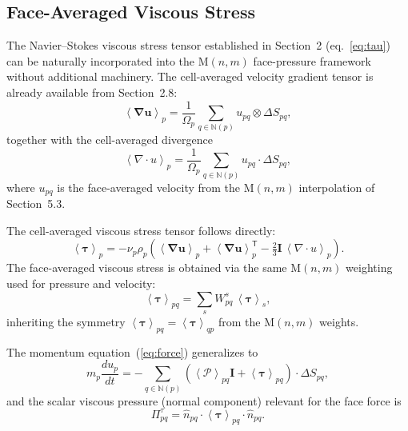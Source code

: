 \documentclass[twocolumn]{aastex63}
\newcommand{\vel}{{u}}
\newcommand{\surf}[0]{S}
\newcommand{\gradT}[1]{\boldsymbol{\nabla#1}}
\newcommand{\pressure}[0]{\mathcal{P}}
\begin{document}
\subsection{Face-Averaged Viscous Stress}
\label{sec:facetau}

The Navier--Stokes viscous stress tensor established
in Section~2 (eq.~\ref{eq:tau}) can be naturally
incorporated into the M$(n,m)$ face-pressure framework
without additional machinery.
The cell-averaged velocity gradient tensor is already
available from Section~2.8:
\begin{equation}\label{eq:gradv_cell}
  \left<\gradT{u}\right>_p
  = \frac{1}{\Omega_p}
    \sum_{q\in\mathbb{N}(p)}
      \vel_{pq}\otimes\Delta\surf_{pq},
\end{equation}
together with the cell-averaged divergence
\begin{equation}\label{eq:divv_cell}
  \left<\nabla\!\cdot\!\vel\right>_p
  = \frac{1}{\Omega_p}
    \sum_{q\in\mathbb{N}(p)}
      \vel_{pq}\cdot\Delta\surf_{pq},
\end{equation}
where $\vel_{pq}$ is the face-averaged velocity from
the M$(n,m)$ interpolation of Section~5.3.

The cell-averaged viscous stress tensor follows directly:
\begin{equation}\label{eq:tau_cell}
  \left<\boldsymbol{\tau}\right>_p
  = -\nu_p\rho_p\left(
    \left<\gradT{u}\right>_p
    + \left<\gradT{u}\right>_p^\mathsf{T}
    - \tfrac{2}{3}\boldsymbol{I}\,
      \left<\nabla\!\cdot\!\vel\right>_p
  \right).
\end{equation}
The face-averaged viscous stress is obtained via the
same M$(n,m)$ weighting used for pressure and velocity:
\begin{equation}\label{eq:tau_face}
  \left<\boldsymbol{\tau}\right>_{pq}
  = \sum_{s} W^s_{pq}\,
    \left<\boldsymbol{\tau}\right>_s,
\end{equation}
inheriting the symmetry
$\left<\boldsymbol{\tau}\right>_{pq}
 = \left<\boldsymbol{\tau}\right>_{qp}$
from the M$(n,m)$ weights.

The momentum equation~(\ref{eq:force}) generalizes to
\begin{equation}\label{eq:mom_tau}
  m_p\frac{d\vel_p}{dt}
  = -\sum_{q\in\mathbb{N}(p)}
    \left(
      \left<\pressure\right>_{pq}\boldsymbol{I}
      + \left<\boldsymbol{\tau}\right>_{pq}
    \right)\cdot\Delta\surf_{pq},
\end{equation}
and the scalar viscous pressure (normal component)
relevant for the face force is
\begin{equation}\label{eq:pi_tau}
  \Pi_{pq}^{\tau}
  = \hat{n}_{pq}\cdot
    \left<\boldsymbol{\tau}\right>_{pq}
    \cdot\hat{n}_{pq}.
\end{equation}
\end{document}
